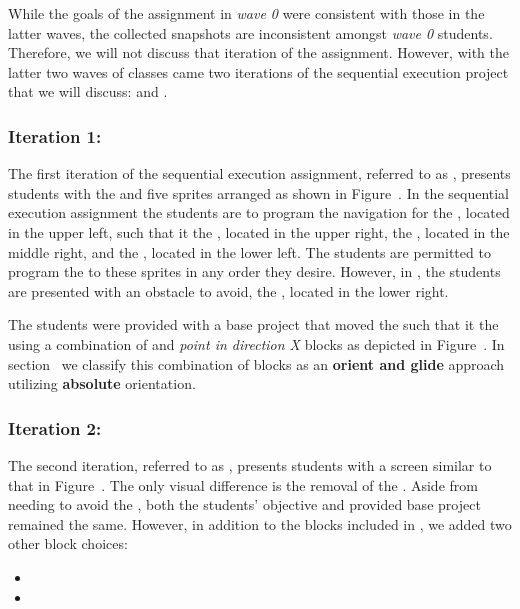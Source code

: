 While the goals of the assignment in \emph{wave 0} were consistent with those
in the latter waves, the collected snapshots are inconsistent amongst
\emph{wave 0} students. Therefore, we will not discuss that iteration of the
assignment. However, with the latter two waves of classes came two iterations
of the sequential execution project that we will discuss: \sone{} and \stwo{}.

\subsubsection{Iteration 1: \sone{}}
The first iteration of the sequential execution assignment, referred to as
\sone{}, presents students with the \stage{} and five sprites arranged as shown
in Figure~. In the sequential execution assignment the
students are to program the navigation for the \net{}, located in the upper
left, such that it  the \bear{}, located in the upper right, the
\horse{}, located in the middle right, and the \zebra{}, located in the lower
left. The students are permitted to program the \net{} to \catch{} these
sprites in any order they desire. However, in \sone{}, the students are
presented with an obstacle to avoid, the \snake{}, located in the lower right.

The students were provided with a base project that moved the \net{} such that
it \caught{} the \zebra{} using a combination of \glideDIST{} and \emph{point
  in direction X} blocks as depicted in
Figure~. In section~ we
classify this combination of blocks as an \textbf{orient and glide} approach
utilizing \textbf{absolute} orientation.

\subsubsection{Iteration 2: \stwo{}}
The second iteration, referred to as \stwo{}, presents students with a screen
similar to that in Figure~. The only visual difference
is the removal of the \snake{}. Aside from needing to avoid the \snake{}, both
the students' objective and provided base project remained the same. However,
in addition to the blocks included in \sone{}, we added two other block
choices:

\begin{itemize}
\item \pointtoward{}
\item \glideto{}
\end{itemize}

